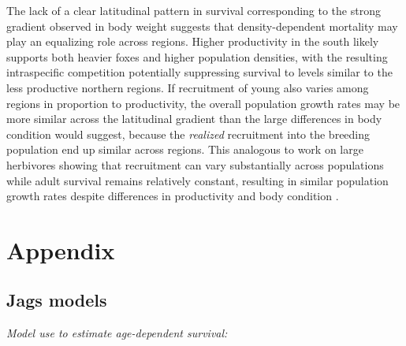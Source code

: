 \documentclass[12pt,a4paper,final,abstract=true,headings=small]{scrartcl}
\begin{document}
The lack of a clear latitudinal pattern in survival corresponding to the strong gradient observed in body weight suggests that density-dependent mortality may play an equalizing role across regions. Higher productivity in the south likely supports both heavier foxes and higher population densities, with the resulting intraspecific competition potentially suppressing survival to levels similar to the less productive northern regions. If recruitment of young also varies among regions in proportion to productivity, the overall population growth rates may be more similar across the latitudinal gradient than the large differences in body condition would suggest, because the \emph{realized} recruitment into the breeding population  end up similar across regions. This analogous to work on large herbivores showing that recruitment can vary substantially across populations while adult survival remains relatively constant, resulting in similar population growth rates despite differences in productivity and body condition \citep{gaillardTemporalVariationFitness2000}.



\newpage
\singlespacing
\printbibliography

\newpage

\section*{Appendix}

\subsection*{Jags models}

\emph{Model use to estimate age-dependent survival:} \label{app:brood}
\end{document}
